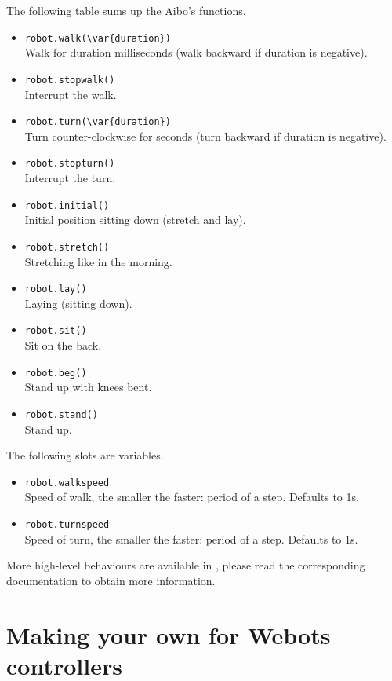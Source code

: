 The following table sums up the Aibo's functions.

\begin{itemize}
\item \lstinline|robot.walk(\var{duration})|\\
  Walk for duration milliseconds (walk backward if duration is negative).
\item \lstinline|robot.stopwalk()|\\
  Interrupt the walk.
\item \lstinline|robot.turn(\var{duration})|\\
  Turn counter-clockwise for  seconds (turn backward if
  duration is negative).
\item \lstinline|robot.stopturn()|\\
  Interrupt the turn.
\item \lstinline|robot.initial()|\\
  Initial position sitting down (stretch and lay).
\item \lstinline|robot.stretch()|\\
  Stretching like in the morning.
\item \lstinline|robot.lay()|\\
  Laying (sitting down).
\item \lstinline|robot.sit()|\\
  Sit on the back.
\item \lstinline|robot.beg()|\\
  Stand up with knees bent.
\item \lstinline|robot.stand()|\\
  Stand up.
\end{itemize}

The following slots are variables.
\begin{itemize}
\item \lstinline|robot.walkspeed|\\
  Speed of walk, the smaller the faster: period of a step. Defaults to
  1s.
\item \lstinline|robot.turnspeed|\\
  Speed of turn, the smaller the faster: period of a step. Defaults to
  1s.
\end{itemize}

More high-level behaviours are available in , please read
the corresponding documentation to obtain more information.


\section{Making your own \urbi for Webots controllers}

